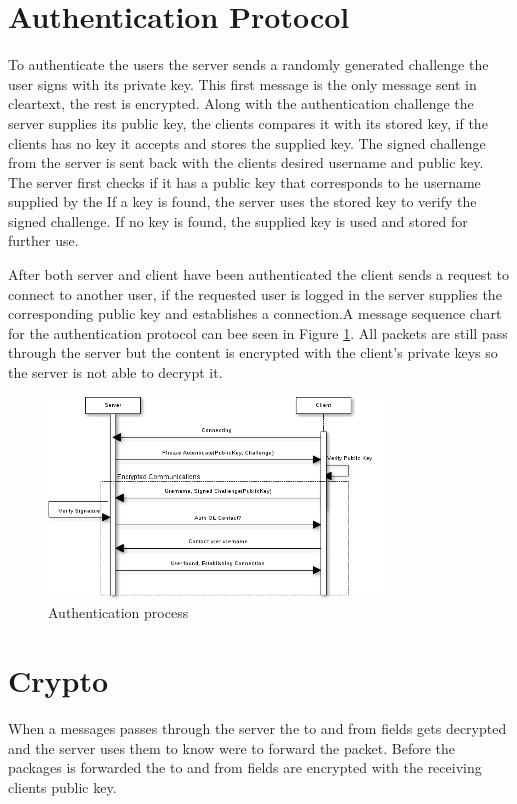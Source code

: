 \documentclass[twocolumn,11pt]{IEEEtran}
\begin{document}
\section{Authentication Protocol}
\label{sec:auth}
To authenticate the users the server sends a randomly generated challenge the user signs with its private key. This first message is the only message sent in cleartext, the rest is encrypted. Along with the authentication challenge the server supplies its public key, the clients compares it with its stored key, if the clients has no key it accepts and stores the supplied key. The signed challenge from the server is sent back with the clients desired username and public key. The server first checks if it has a public key that corresponds to he username supplied by the  If a key is found, the server uses the stored key to verify the signed challenge. If no key is found, the supplied key is used and stored for further use.

After both server and client have been authenticated the client sends a request to connect to another user, if the requested user is logged in the server supplies the corresponding public key and establishes a connection.A message sequence chart for the authentication protocol can bee seen in Figure \ref{fig:auth}. All packets are still pass through the server but the content is encrypted with the client's private keys so the server is not able to decrypt it.


\begin{figure}
\label{fig:auth}
\centerline{
\includegraphics[width=90mm]{auth.png}}
\caption{Authentication process}
\end{figure}

 \section{Crypto}
When a messages passes through the server the to and from fields gets decrypted and the server uses them to know were to forward the packet. Before the packages is forwarded the to and from fields are encrypted with the receiving clients public key.
\end{document}
